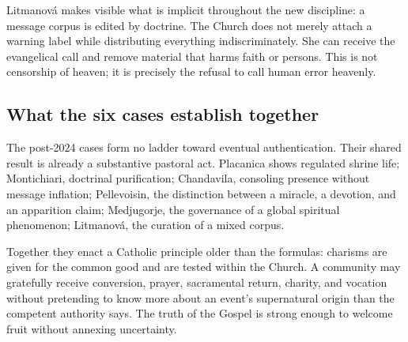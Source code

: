 Litmanová makes visible what is implicit throughout the new discipline: a message corpus is edited by doctrine. The Church does not merely attach a warning label while distributing everything indiscriminately. She can receive the evangelical call and remove material that harms faith or persons. This is not censorship of heaven; it is precisely the refusal to call human error heavenly.

\subsection{What the six cases establish together}

The post-2024 cases form no ladder toward eventual authentication. Their shared result is already a substantive pastoral act. Placanica shows regulated shrine life; Montichiari, doctrinal purification; Chandavila, consoling presence without message inflation; Pellevoisin, the distinction between a miracle, a devotion, and an apparition claim; Medjugorje, the governance of a global spiritual phenomenon; Litmanová, the curation of a mixed corpus.

Together they enact a Catholic principle older than the formulas: charisms are given for the common good and are tested within the Church. A community may gratefully receive conversion, prayer, sacramental return, charity, and vocation without pretending to know more about an event's supernatural origin than the competent authority says. The truth of the Gospel is strong enough to welcome fruit without annexing uncertainty.
